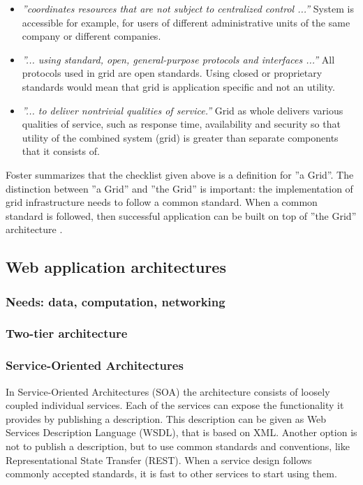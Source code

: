 \documentclass{tktltiki}
\begin{document}
\begin{itemize}
	\item{\emph{''coordinates resources that are not subject to centralized control ...''}
System is accessible for example, for users of different administrative units of the same company or different companies.}
	\item{\emph{''... using standard, open, general-purpose protocols and interfaces ...''}
All protocols used in grid are open standards. Using closed or proprietary standards would mean that grid is application specific and not an utility.
}
	\item{\emph{''... to deliver nontrivial qualities of service.''}
Grid as whole delivers various qualities of service, such as response time, availability and security so that utility of the combined system (grid) is greater than separate components that it consists of.
}

\end{itemize}


Foster summarizes that the checklist given above is a definition for ''a Grid''.  The distinction between ''a Grid'' and ''the Grid'' is important: the implementation of grid infrastructure needs to follow a common standard.  When a common standard is followed, then successful application can be built on top of ''the Grid'' architecture \cite{WhatIsGrid02}.







\subsection{Web application architectures}

\subsubsection{Needs: data, computation, networking}

\subsubsection{Two-tier architecture}

\subsubsection{Service-Oriented Architectures}

In Service-Oriented Architectures (SOA) the architecture consists of loosely coupled individual services.  Each of the services can expose the functionality it provides by publishing a description.  This description can be given as Web Services Description Language (WSDL), that is based on XML.  Another option is not to publish a description, but to use common standards and conventions, like Representational State Transfer (REST).  When a service design follows commonly accepted standards, it is fast to other services to start using them.
\end{document}
